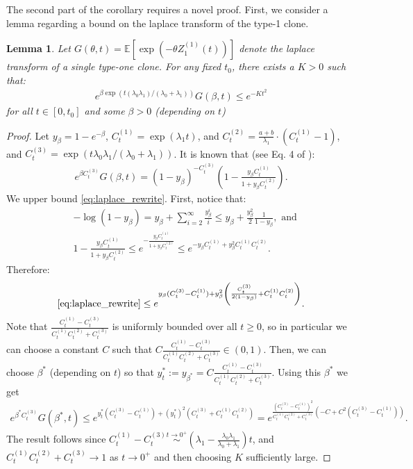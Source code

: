 \documentclass{article}
\numberwithin{equation}{section}
\newtheorem{lemma}{Lemma}
\begin{document}
The second part of the corollary requires a novel proof. First, we consider a lemma regarding a bound on the laplace transform of the type-1 clone.
\begin{lemma}\label{lem:MGF_bound}
  Let $G(\theta,t)=\mathbb{E}[\exp(-\theta Z_1^{(1)}(t))]$ denote the laplace transform of a single type-one clone. For any fixed $t_0$, there exists a $K>0$ such that:
  \begin{align*}
    e^{\beta \exp(t(\lambda_0\lambda_1)/(\lambda_0+\lambda_1))}G(\beta,t)\leq e^{-Kt^2}
  \end{align*}
  for all $t\in [0,t_0]$ and some $\beta>0$ (depending on $t$)
\end{lemma}
\begin{proof}
  Let $y_{\beta}=1-e^{-\beta}$, $C_t^{(1)}=\exp(\lambda_1t)$, and $C_t^{(2)}=\frac{a+b}{\lambda_1} \cdot (C_t^{(1)}-1)$, and $C_t^{(3)}=\exp(t\lambda_0\lambda_1/(\lambda_0+\lambda_1))$. It is known that (see Eq. 4 of \cite{durrettbranching2015}):
  \begin{align}
    e^{\beta C_t^{(3)}}G(\beta,t)=(1-y_{\beta})^{-C_t^{(3)}}\left(1-\frac{y_{\beta}C_t^{(1)}}{1+y_{\beta}C_t^{(2)}}\right).\label{eq:laplace_rewrite}
  \end{align}
  We upper bound \ref{eq:laplace_rewrite}. First, notice that:
  \begin{align*}
    &-\log(1-y_\beta)=y_\beta+\sum_{i=2}^\infty\frac{y_\beta^i}{i}\leq y_\beta+\frac{y_\beta^2}{2}\frac{1}{1-y_\beta},\text{ and}\\
    &1-\frac{y_\beta C_t^{(1)}}{1+y_\beta C_t^{(2)}}\leq e^{-\frac{y_\beta C_t^{(1)}}{1+y_\beta C_t^{(2)}}}\leq e^{-y_\beta C_t^{(1)}+y_\beta^2 C_t^{(1)}C_t^{(2)}}.
  \end{align*}
  Therefore:
  \begin{align*}
    \ref{eq:laplace_rewrite}\leq e^{y_\beta(C_t^{(3)}-C_t^{(1)})+y_\beta^2\left(\frac{C_t^{(3)}}{2(1-y_\beta)}+C_t^{(1)}C_t^{(2)}\right)}.
  \end{align*}
  Note that $\frac{C_t^{(1)}-C_t^{(3)}}{C_t^{(1)}C_t^{(2)}+C_t^{(3)}}$ is uniformly bounded over all $t\geq 0$, so in particular we can choose a constant $C$ such that
  $C\frac{C_t^{(1)}-C_t^{(3)}}{C_t^{(1)}C_t^{(2)}+C_t^{(3)}}\in (0,1)$. Then, we can choose $\beta^*$ (depending on $t$) so that $y^\ast_t:=y_{\beta^\ast}=C\frac{C_t^{(1)}-C_t^{(3)}}{C_t^{(1)}C_t^{(2)}+C_t^{(3)}}$. Using this $\beta^*$ we get
  \begin{align*}
    e^{\beta^\ast C_t^{(3)}}G(\beta^\ast,t)\leq e^{y_t^\ast(C_t^{(3)}-C_t^{(1)})+(y_t^\ast)^2\left(C_t^{(3)}+C_t^{(1)}C_t^{(2)}\right)}=e^{\frac{(C_t^{(3)}-C_t^{(1)})^2}{C_t^{(1)}C_t^{(2)}+C_t^{(3)}}\left(-C+C^2(C_t^{(3)}-C_t^{(1)})\right)}.
  \end{align*}
  The result follows since $C_t^{(1)}-C_t^{(3)}\overset{t\to 0^+}{\sim}\left(\lambda_1-\frac{\lambda_0\lambda_1}{\lambda_0+\lambda_1}\right)t$, and $C_t^{(1)}C_t^{(2)}+C_t^{(3)}\to 1$ as $t\to 0^+$  and then choosing $K$ sufficiently large.

\end{proof}
\end{document}
